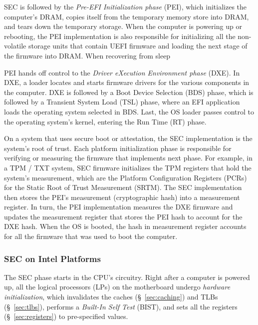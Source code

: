 SEC is followed by the \textit{Pre-EFI Initialization phase} (PEI), which
initializes the computer's DRAM, copies itself from the temporary memory
store into DRAM, and tears down the temporary storage. When the computer is
powering up or rebooting, the PEI implementation is also responsible for
initializing all the non-volatile storage units that contain UEFI firmware and
loading the next stage of the firmware into DRAM. When recovering from sleep

PEI hands off control to the \textit{Driver eXecution Environment phase} (DXE).
In DXE, a loader locates and starts firmware drivers for the various components
in the computer. DXE is followed by a Boot Device Selection (BDS) phase, which
is followed by a Transient System Load (TSL) phase, where an EFI application
loads the operating system selected in BDS. Last, the OS loader passes control
to the operating system's kernel, entering the Run Time (RT) phase.

On a system that uses secure boot or attestation, the SEC implementation is the
system's root of trust. Each platform initialization phase is responsible for
verifying or measuring the firmware that implements next phase. For example, in
a TPM / TXT system, SEC firmware initializes the TPM registers that hold the
system's measurement, which are the Platform Configuration Registers (PCRs) for
the Static Root of Trust Measurement (SRTM). The SEC implementation then stores
the PEI's measurement (cryptographic hash) into a measurement register. In
turn, the PEI implementation measures the DXE firmware and updates the
measurement register that stores the PEI hash to account for the DXE hash. When
the OS is booted, the hash in measurement register accounts for all the
firmware that was used to boot the computer.


\subsubsection{SEC on Intel Platforms}
\label{sec:uefi_sec_details}


The SEC phase starts in the CPU's circuitry. Right after a computer is powered
up, all the logical processors (LPs) on the motherboard undergo
\textit{hardware initialization}, which invalidates the caches
(\S~\ref{sec:caching}) and TLBs (\S~\ref{sec:tlbs}), performs a
\textit{Built-In Self Test} (BIST), and sets all the registers
(\S~\ref{sec:registers}) to pre-specified values.

